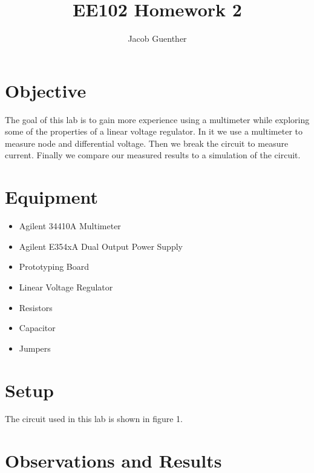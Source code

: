 \documentclass{article}
\title{EE102 Homework 2}
\author{Jacob Guenther}
\begin{document}


\section{Objective}
The goal of this lab is to gain more experience using a multimeter while exploring some of the properties of a linear voltage regulator. In it we use a multimeter to measure node and differential voltage. Then we break the circuit to measure current. Finally we compare our measured results to a simulation of the circuit.

\section{Equipment}
\begin{itemize}
	\item Agilent 34410A Multimeter
	\item Agilent E354xA Dual Output Power Supply
	\item Prototyping Board
	\item Linear Voltage Regulator
	\item Resistors
	\item Capacitor
	\item Jumpers
\end{itemize}

\section{Setup}
The circuit used in this lab is shown in figure 1.

\section{Observations and Results}
\end{document}
